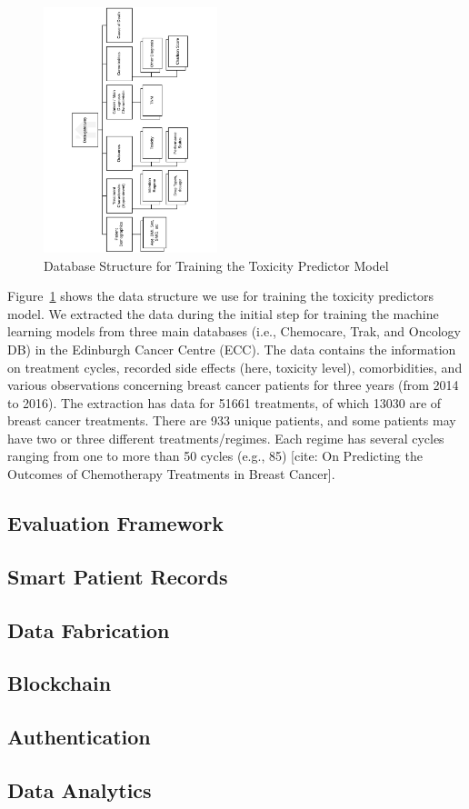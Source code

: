 \begin{figure}[t!]
    \centering
    \includegraphics[angle=-90,width=0.45\textwidth]{images/ECG.pdf}
    \caption{Database Structure for Training the Toxicity Predictor Model}
    \label{fig:ECG}
\end{figure}
Figure~\ref{fig:ECG} shows the data structure we use for training the toxicity predictors model. We extracted the data during the initial step for training the machine learning models from three main databases (i.e., Chemocare, Trak, and Oncology DB) in the Edinburgh Cancer Centre (ECC). The data contains the information on treatment cycles, recorded side effects (here, toxicity level), comorbidities, and various observations concerning breast cancer patients for three years (from 2014 to 2016). The extraction has data for 51661 treatments, of which 13030 are of breast cancer treatments. There are 933 unique patients, and some patients may have two or three different treatments/regimes. Each regime has several cycles ranging from one to more than 50 cycles (e.g., 85) [cite: On Predicting the Outcomes of Chemotherapy Treatments in Breast Cancer].

\subsection{Evaluation Framework}

\subsection{Smart Patient Records}

\subsection{Data Fabrication}

\subsection{Blockchain}

\subsection{Authentication}

\subsection{Data Analytics}

